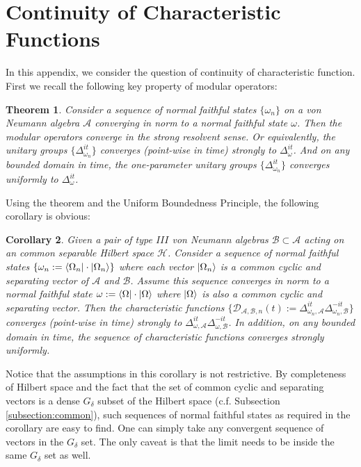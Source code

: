 \documentclass[a4paper,11pt]{article}
\newtheorem{theorem}{Theorem}
\newtheorem{corollary}[theorem]{Corollary}
\theoremstyle{definition}
\begin{document}
\section{Continuity of Characteristic Functions}\label{section:continuity}
In this appendix, we consider the question of continuity of characteristic function. First we recall the following key property of modular operators:
\begin{theorem}\label{theorem:continuityofmodular}
    Consider a sequence of normal faithful states $\{\omega_n\}$ on a von Neumann algebra $\mathcal{A}$ converging in norm to a normal faithful state $\omega$. Then the modular operators converge in the strong resolvent sense. Or equivalently, the unitary groups $\{\Delta_{\omega_n}^{it}\}$ converges (point-wise in time) strongly to $\Delta_\omega^{it}$. And on any bounded domain in time, the one-parameter unitary groups $\{\Delta_{\omega_n}^{it}\}$ converges uniformly to $\Delta_\omega^{it}$. 
\end{theorem}
Using the theorem and the Uniform Boundedness Principle, the following corollary is obvious:
\begin{corollary}\label{corollary:firstcorollary}
    Given a pair of type $III$ von Neumann algebras $\mathcal{B}\subset\mathcal{A}$ acting on an common separable Hilbert space $\mathcal{H}$. Consider a sequence of normal faithful states $\{\omega_n:=\bra{\Omega_n}\cdot\ket{\Omega_n}\}$ where each vector $\ket{\Omega_n}$ is a common cyclic and separating vector of $\mathcal{A}$ and $\mathcal{B}$. Assume this sequence converges in norm to a normal faithful state $\omega:=\bra{\Omega}\cdot\ket{\Omega}$ where $\ket{\Omega}$ is also a common cyclic and separating vector. Then the characteristic functions $\{\mathcal{D}_{\mathcal{A}, \mathcal{B}, n}(t) := \Delta_{\omega_n,\mathcal{A}}^{it}\Delta_{\omega_n, \mathcal{B}}^{-it}\}$ converges (point-wise in time) strongly to $\Delta_{\omega,\mathcal{A}}^{it}\Delta_{\omega,\mathcal{B}}^{-it}$. In addition, on any bounded domain in time, the sequence of characteristic functions converges strongly uniformly. 
\end{corollary}
Notice that the assumptions in this corollary is not restrictive. By completeness of Hilbert space and the fact that the set of common cyclic and separating vectors is a dense $G_\delta$ subset of the Hilbert space (c.f. Subsection \ref{subsection:common}), such sequences of normal faithful states as required in the corollary are easy to find. One can simply take any convergent sequence of vectors in the $G_\delta$ set. The only caveat is that the limit needs to be inside the same $G_\delta$ set as well. 
\end{document}
